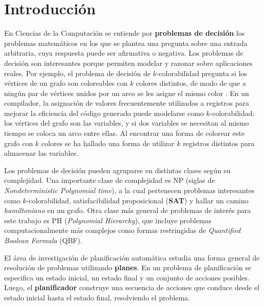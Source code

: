 
\chapter*{Introducción} %
\label{Intro}
En Ciencias de la Computación se entiende por \textbf{problemas de decisión}
los problemas matemáticos en los que se plantea una pregunta sobre una entrada
arbitraria, cuya respuesta puede ser afirmativa o negativa.
Los problemas de decisión son interesantes porque permiten modelar y razonar
sobre aplicaciones reales. Por ejemplo, el problema de decisión de
$k$-colorabilidad pregunta si los vértices de un grafo son coloreables 
con $k$ colores distintos, de modo de que a ningún par de vértices unidos por
un arco se les asigne el mismo color . En un compilador, la asignación de valores
frecuentemente utilizados a registros para
mejorar la eficiencia del código generado puede modelarse como
$k$-colorabilidad: los vértices del grafo son las variables, y si dos variables
se necesitan al mismo tiempo se coloca un arco entre ellas. Al encontrar una
forma de colorear este grafo con $k$ colores se ha hallado una forma de
utilizar $k$ registros distintos para almacenar las variables.

Los problemas de decisión pueden agruparse en distintas clases según su
complejidad. Una importante clase de complejidad es NP (siglas de
\textit{Nondeterministic Polynomial time}), a la cual pertenecen problemas
interesantes como $k$-colorabilidad, satisfacibilidad proposicional
(\textbf{SAT}) y hallar un camino \textit{hamiltoniano} en un grafo. Otra clase
más general de problemas de interés para este trabajo es PH (\textit{Polynomial Hierarchy}),
que incluye problemas computacionalmente más complejos como formas restringidas de
\textit{Quantified Boolean Formula} (QBF).

El área de investigación de planificación automática estudia una forma general
de resolución de problemas utilizando \textbf{planes}. En un problema de planificación
se especifica un estado inicial, un estado final y un conjunto de acciones
posibles. Luego, el \textbf{planificador} construye una secuencia de acciones que conduce
desde el estado inicial hasta el estado final, resolviendo el problema.


